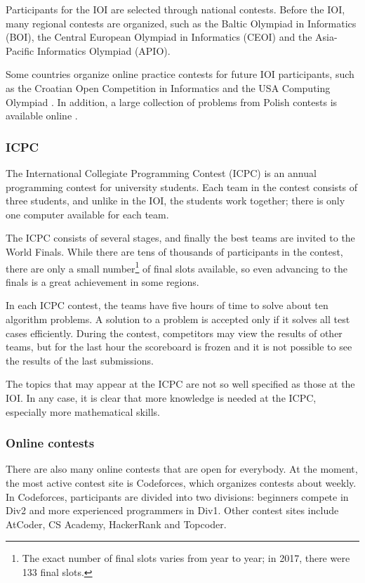 Participants for the IOI are selected through
national contests.
Before the IOI, many regional contests are organized,
such as the Baltic Olympiad in Informatics (BOI),
the Central European Olympiad in Informatics (CEOI)
and the Asia-Pacific Informatics Olympiad (APIO).

Some countries organize online practice contests
for future IOI participants,
such as the Croatian Open Competition in Informatics \cite{coci}
and the USA Computing Olympiad \cite{usaco}.
In addition, a large collection of problems from Polish contests
is available online \cite{main}.

\subsubsection{ICPC}

The International Collegiate Programming Contest (ICPC)
is an annual programming contest for university students.
Each team in the contest consists of three students,
and unlike in the IOI, the students work together;
there is only one computer available for each team.

The ICPC consists of several stages, and finally the
best teams are invited to the World Finals.
While there are tens of thousands of participants
in the contest, there are only a small number\footnote{The exact number of final
slots varies from year to year; in 2017, there were 133 final slots.} of final slots available,
so even advancing to the finals
is a great achievement in some regions.

In each ICPC contest, the teams have five hours of time to
solve about ten algorithm problems.
A solution to a problem is accepted only if it solves
all test cases efficiently.
During the contest, competitors may view the results of other teams,
but for the last hour the scoreboard is frozen and it
is not possible to see the results of the last submissions.

The topics that may appear at the ICPC are not so well
specified as those at the IOI.
In any case, it is clear that more knowledge is needed
at the ICPC, especially more mathematical skills.

\subsubsection{Online contests}

There are also many online contests that are open for everybody.
At the moment, the most active contest site is Codeforces,
which organizes contests about weekly.
In Codeforces, participants are divided into two divisions:
beginners compete in Div2 and more experienced programmers in Div1.
Other contest sites include AtCoder, CS Academy, HackerRank and Topcoder.

